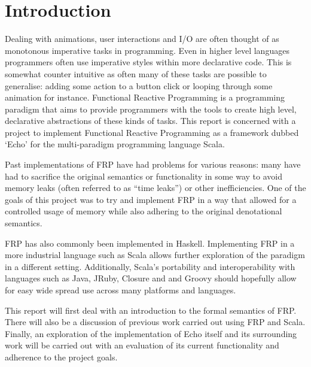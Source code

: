 \chapter{Introduction}

  Dealing with animations, user interactions and I/O are often thought of as monotonous imperative tasks
  in programming. Even in higher level languages programmers often use imperative
  styles within more declarative code. This is somewhat counter intuitive as often many of these tasks are possible to generalise: adding
  some action to a button click or looping through some animation for instance. Functional Reactive Programming
  is a programming paradigm that aims to provide programmers with the tools to create high level,
  declarative abstractions of these kinds of tasks. This report is concerned with a project to
  implement Functional Reactive Programming as a framework dubbed `Echo' \cite{Stott} for the multi-paradigm programming language
  Scala.

  Past implementations of FRP have had problems for various reasons: many have had to sacrifice the original semantics or functionality in some way to avoid
  memory leaks (often referred to as ``time leaks'') or other inefficiencies. One of the goals
  of this project was to try and implement FRP in a way that allowed for a controlled usage of memory while also
  adhering to the original denotational semantics. 
  
  FRP
  has also commonly been implemented in Haskell. Implementing FRP in a more industrial language such as Scala allows
  further exploration of the paradigm in a different setting. Additionally, Scala's portability and interoperability with
  languages such as Java, JRuby, Closure and and Groovy should hopefully allow for easy wide spread use across many platforms and languages. 

  This report will first deal with an introduction to the formal semantics of FRP. There will also be a discussion of previous    
  work carried out using FRP and Scala.
  Finally, an exploration of the implementation of Echo itself and its surrounding work will be carried out with an
  evaluation of its current functionality and adherence to the project goals.